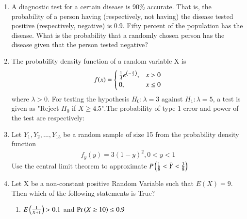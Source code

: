 \begin{enumerate}[label=\thesection.\arabic*.,ref=\thesection.\theenumi]
\item A diagnostic test for a certain disease is 90\% accurate. That is, the probability of a person having (respectively, not having) the disease tested positive (respectively, negative) is 0.9. Fifty percent of the population has the disease. What is the probability that a randomly chosen person has the disease given that the person tested negative?
\\
\solution


%
\item The probability density function of a random variable X is
\begin{equation}
f(x)=
\begin{cases}
\frac{1}{\lambda}e^{\left(-\frac{x}{\lambda}\right)}, & x>0\\
0, & x\leq 0
\end{cases}
\end{equation}
where $\lambda>0.$ For testing the hypothesis $H_{0}:\lambda=3$ against $H_{1}:\lambda=5$, a test is given as "Reject $H_0$ if $X\geq 4.5$".The probability of type 1 error and power of the test are respectively: 
\begin{enumerate}
\end{enumerate}
%
  \solution
  
%
\item Let $Y_{1},Y_{2},...,Y_{15}$ be a random sample of size 15 from the probability density function 
\begin{align}
\tag{Eq:1}
    f_{y}(y)=3(1-y)^{2} , 0<y<1
\end{align}
Use the central limit theorem to approximate $P\left(\frac{1}{8}<\Bar{Y}<\frac{3}{8}\right)$
%
\solution
  
  \item Let X be a non-constant positive Random Variable such that $E(X) = 9$.\\
  Then which of the following statements is True?
  \begin{enumerate}
  \item  $E\left(\frac{1}{X+1}\right) > 0.1$ and $\Pr\left(X \ge 10\right) \le 0.9$

\end{enumerate}
\end{enumerate}
